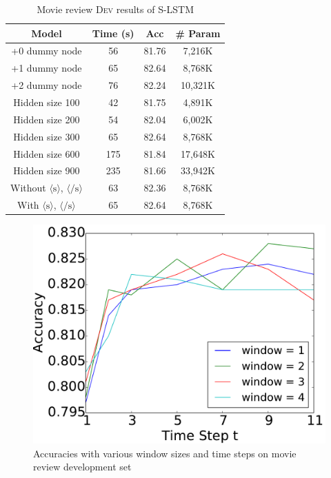 \documentclass[11pt,a4paper]{article}
\begin{document}
\begin{table}[t]
	\centering
	\tabcolsep=0.1cm
	\begin{tabular}{|ccc|ccc|}
		\hline
		\multicolumn{3}{|c|}{\textbf{Model}}& \textbf{Time (s)} & \textbf{Acc} & \textbf{\# Param}\\ 
		\hline

		\multicolumn{3}{|c|}{+0 dummy node}&56&81.76 &7,216K\\ 
		\multicolumn{3}{|c|}{+1 dummy node}&65&82.64&8,768K\\ 
		\multicolumn{3}{|c|}{+2 dummy node}&76&82.24 &10,321K\\ 
		\hline
		\multicolumn{3}{|c|}{Hidden size 100 }&42&81.75 &4,891K\\
		\multicolumn{3}{|c|}{Hidden size 200}&54&82.04 &6,002K\\ 
		\multicolumn{3}{|c|}{Hidden size 300}&65&82.64 &8,768K\\ 
		\multicolumn{3}{|c|}{Hidden size 600}&175&81.84&17,648K\\
		\multicolumn{3}{|c|}{Hidden size 900}&235&81.66 &33,942K\\ 
		\hline
		\multicolumn{3}{|c|}{Without $\langle \textrm{s} \rangle$,  $\langle \textrm{/s} \rangle$}&63&82.36&8,768K\\ 
		\multicolumn{3}{|c|}{With $\langle \textrm{s} \rangle$,  $\langle \textrm{/s} \rangle$}&65&82.64&8,768K \\
		\hline
	\end{tabular}
	\caption{\label{tab:movie_dev}Movie review \textsc{Dev} results of S-LSTM}
\end{table}


\begin{figure}
\vspace{-0.4em}
\centering
\includegraphics[width=0.9\linewidth]{iteration_window.pdf}
\vspace{-0.8em}
\caption{Accuracies with various window sizes and time steps on movie review development set}
\label{fig:iteration_window}
\end{figure}
\end{document}
